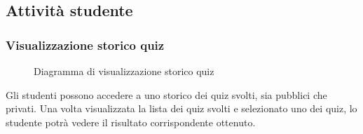 \documentclass[a4paper, titlepage]{article}
\begin{document}
\newpage
\subsection{Attività studente}

\subsubsection{Visualizzazione storico quiz}
\begin{figure}[H]
	\centering
	\noindent{}
	\caption{Diagramma di visualizzazione storico quiz}
\end{figure}
Gli studenti possono accedere a uno storico dei quiz svolti, sia pubblici che privati. Una volta visualizzata la lista dei quiz svolti e selezionato uno dei quiz, lo studente potrà vedere il risultato corrispondente ottenuto. 

\newpage
\end{document}
